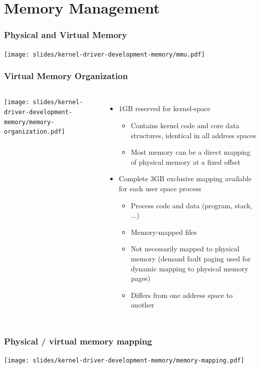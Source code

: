 \section{Memory Management}

\begin{frame}
  \frametitle{Physical and Virtual Memory}
  \begin{center}
    \texttt{[image: slides/kernel-driver-development-memory/mmu.pdf]}
  \end{center}
\end{frame}

\begin{frame}
  \frametitle{Virtual Memory Organization}
  \begin{columns}
    \texttt{[image: slides/kernel-driver-development-memory/memory-organization.pdf]}
    \begin{itemize}
    \item 1GB reserved for kernel-space
      \begin{itemize}
      \item Contains kernel code and core data structures, identical
        in all address spaces
      \item Most memory can be a direct mapping of physical memory at
        a fixed offset
      \end{itemize}
    \item Complete 3GB exclusive mapping available for each user space
      process
      \begin{itemize}
      \item Process code and data (program, stack, ...)
      \item Memory-mapped files
      \item Not necessarily mapped to physical memory (demand fault
        paging used for dynamic mapping to physical memory pages)
      \item Differs from one address space to another
      \end{itemize}
    \end{itemize}
  \end{columns}
\end{frame}

\begin{frame}
  \frametitle{Physical / virtual memory mapping}
  \begin{center}
    \texttt{[image: slides/kernel-driver-development-memory/memory-mapping.pdf]}
  \end{center}
\end{frame}

